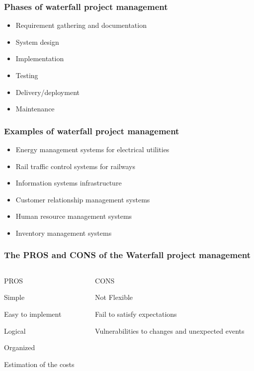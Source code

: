 \documentclass{beamer}
\begin{document}
\begin{frame}
    \frametitle{Phases of waterfall project management}
    \begin{itemize}
        \setlength\itemsep{1em}
        \item Requirement gathering and documentation \pause
        \item System design \pause
        \item Implementation \pause
        \item Testing \pause
        \item Delivery/deployment \pause
        \item Maintenance
    \end{itemize}
\end{frame}

\begin{frame}
    \frametitle{Examples of waterfall project management}
    \begin{itemize}
        \setlength\itemsep{1em}
        \item Energy management systems for electrical utilities \pause
        \item Rail traffic control systems for railways \pause
        \item Information systems infrastructure \pause
        \item Customer relationship management systems \pause
        \item Human resource management systems \pause
        \item Inventory management systems     
    \end{itemize}
\end{frame}

\begin{frame}
    
    \frametitle{The PROS and CONS of the Waterfall project management}
    \begin{itemize}
    \begin{columns}[T] %
        \begin{column}{.48\textwidth}
        PROS \pause
        \item Simple 
        \item Easy to implement 
        \item Logical 
        \item Organized 
        \item Estimation of the costs 
        \end{column}%
        \hfill%
        \begin{column}{.48\textwidth}
        CONS \pause
        \item Not Flexible
        \item Fail to satisfy expectations 
        \item Vulnerabilities to changes and unexpected events
        \end{column}%
        \end{columns}   
        \setlength\itemsep{1em}
        
        
    \end{itemize}
\end{frame}
\end{document}
